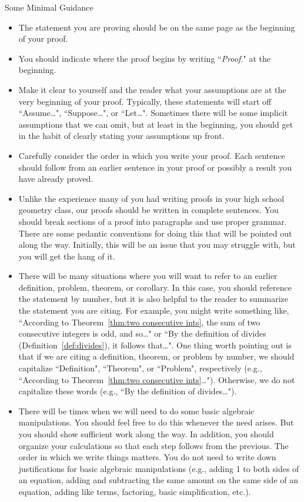 \begin{section}{Some Minimal Guidance}
\begin{itemize}
\item The statement you are proving should be on the same page as the beginning of your proof.   
\item You should indicate where the proof begins by writing ``\emph{Proof.}" at the beginning.  
\item Make it clear to yourself and the reader what your assumptions are at the very beginning of your proof. Typically, these statements will start off ``Assume\ldots", ``Suppose\ldots", or ``Let\ldots".  Sometimes there will be some implicit assumptions that we can omit, but at least in the beginning, you should get in the habit of clearly stating your assumptions up front. 
\item Carefully consider the order in which you write your proof. Each sentence should follow from an earlier sentence in your proof or possibly a result you have already proved.
\item Unlike the experience many of you had writing proofs in your high school geometry class, our proofs should be written in complete sentences.  You should break sections of a proof into paragraphs and use proper grammar.  There are some pedantic conventions for doing this that will be pointed out along the way.  Initially, this will be an issue that you may struggle with, but you will get the hang of it.
\item There will be many situations where you will want to refer to an earlier definition, problem, theorem, or corollary.  In this case, you should reference the statement by number, but it is also helpful to the reader to summarize the statement you are citing.  For example, you might write something like, ``According to Theorem~\ref{thm:two consecutive ints}, the sum of two consecutive integers is odd, and so\ldots" or ``By the definition of divides (Definition~\ref{def:divides}), it follows that\ldots". One thing worth pointing out is that if we are citing a definition, theorem, or problem by number, we should capitalize ``Definition", ``Theorem", or ``Problem", respectively (e.g., ``According to Theorem~\ref{thm:two consecutive ints}\ldots"). Otherwise, we do not capitalize these words (e.g., ``By the definition of divides\ldots").
\item There will be times when we will need to do some basic algebraic manipulations.  You should feel free to do this whenever the need arises.  But you should show sufficient work along the way.  In addition, you should organize your calculations so that each step follows from the previous.  The order in which we write things matters. You do not need to write down justifications for basic algebraic manipulations (e.g., adding 1 to both sides of an equation, adding and subtracting the same amount on the same side of an equation, adding like terms, factoring, basic simplification, etc.).  

\end{itemize}
\end{section}

